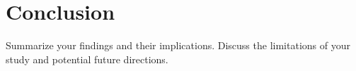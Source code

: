 \chapter{Conclusion}
\label{ch:conclusion}
Summarize your findings and their implications. Discuss the limitations of your study and potential future directions.
